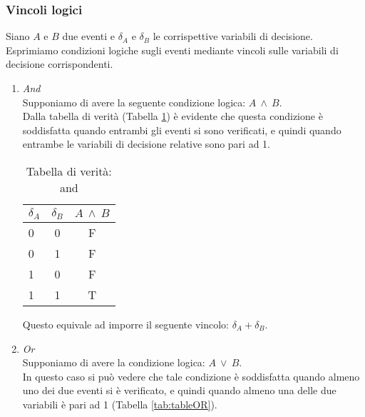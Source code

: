 \subsubsection*{Vincoli logici}
Siano $A$ e $B$ due eventi e $\delta_A$ e $\delta_B$ le corrispettive variabili di decisione. Esprimiamo condizioni logiche sugli eventi mediante vincoli sulle variabili di decisione corrispondenti.
\begin{enumerate}
\item \textit{And}\\
Supponiamo di avere la seguente condizione logica: $A~\wedge~B$.\\
Dalla tabella di verità (Tabella \ref{tab:tableAND}) è evidente che questa condizione è soddisfatta quando entrambi gli eventi si sono verificati, e quindi quando entrambe le variabili di decisione relative sono pari ad 1.

\begin{table}[h!]
  \begin{center}
    \begin{tabular}{l|c|c} %
      $\delta_A$ & $\delta_B$ & $A~\wedge~B$ \\
      \hline
      0 & 0 & F\\
      0 & 1 & F\\
      1 & 0 & F\\
      1 & 1 & T\\
    \end{tabular}
    \caption{Tabella di verità: and}
    \label{tab:tableAND}
  \end{center}
\end{table}

Questo equivale ad imporre il seguente vincolo: $\delta_A + \delta_B$.

\item \textit{Or}\\
Supponiamo di avere la condizione logica: $A~\vee~B$.\\
In questo caso si può vedere che tale condizione è soddisfatta quando almeno uno dei due eventi si è verificato, e quindi quando almeno una delle due variabili è pari ad 1 (Tabella \ref{tab:tableOR}).
\newpage


\end{enumerate}
